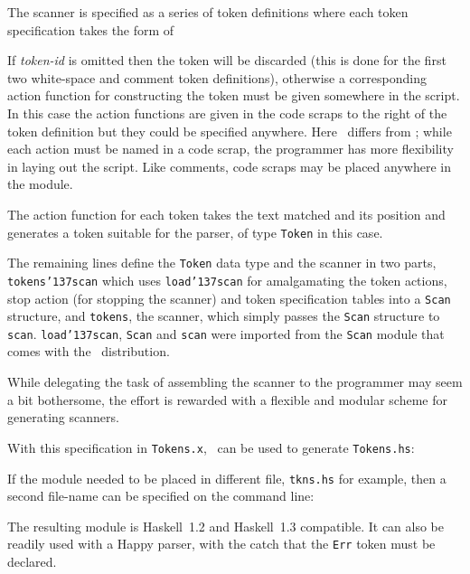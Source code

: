 The scanner is specified as a series of token definitions where each token
specification takes the form of


If {\it token-id} is omitted then the token will be discarded (this is done for
the first two white-space and comment token definitions), otherwise a
corresponding action function for constructing the token must be given
somewhere in the script.  In this case the action functions are given in the
code scraps to the right of the token definition but they could be specified
anywhere.  Here \lx\ differs from \lex; while each action must be
named in a code scrap, the programmer has more flexibility in laying out the
script.  Like comments, code scraps may be placed anywhere in the module.

The action function for each token takes the text matched and its position and
generates a token suitable for the parser, of type \mbox{\tt Token} in this case.

The remaining lines define the \mbox{\tt Token} data type and the scanner in two parts,
\mbox{\tt tokens{\char'137}scan} which uses \mbox{\tt load{\char'137}scan} for amalgamating the token actions, stop
action (for stopping the scanner) and token specification tables into a \mbox{\tt Scan}
structure, and \mbox{\tt tokens}, the scanner, which simply passes the \mbox{\tt Scan} structure
to \mbox{\tt scan}.  \mbox{\tt load{\char'137}scan}, \mbox{\tt Scan} and \mbox{\tt scan} were imported from the \mbox{\tt Scan} module
that comes with the \lx\ distribution.

While delegating the task of assembling the scanner to the programmer may seem
a bit bothersome, the effort is rewarded with a flexible and modular scheme for
generating scanners.

With this specification in \mbox{\tt Tokens.x}, \lx\ can be used to generate
\mbox{\tt Tokens.hs}:


If the module needed to be placed in different file, \mbox{\tt tkns.hs} for example,
then a second file-name can be specified on the command line:


The resulting module is Haskell~1.2 and Haskell~1.3 compatible.  It can also be
readily used with a Happy parser, with the catch that the \mbox{\tt Err} token must be
declared.

